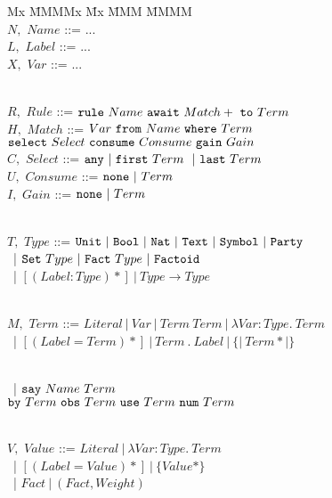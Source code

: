 \begin{figure}
\begin{tabbing}
Mx \= MMMMx \= Mx \= MMM \= MMMM \kill
\\  $N,$ \> $Name$       \> ::= \> ...
\\  $L,$ \> $Label$      \> ::= \> ...
\\  $X,$ \> $Var$        \> ::= \> ...

\\[1ex]
    $R,$ \> $Rule$      \> ::= \> $\texttt{rule}~ Name~ \texttt{await}~ Match+~ \texttt{to}~ Term$
\\[0.5ex]
    $H,$ \> $Match$     \> ::= \> $Var~ \texttt{from}~ Name~ \texttt{where}~ Term$
\\      \>              \>     \> \hspace{1.6em}
                                  $\texttt{select}~ Select~ \texttt{consume}~ Consume~ \texttt{gain}~ Gain$
\\[0.5ex]
   $C,$ \> $Select$     \> ::= \> $\texttt{any}~ |~ \texttt{first}~ Term~ ~|~ \texttt{last}~ Term$
\\ $U,$ \> $Consume$    \> ::= \> $\texttt{none}~ |~ Term$
\\ $I,$ \> $Gain$       \> ::= \> $\texttt{none}~ |~ Term$

\\[1ex]
   $T,$ \> $Type$       \> ::= \> $\texttt{Unit}~ |~ \texttt{Bool}~ |~ \texttt{Nat}~ |~ \texttt{Text}~ |~ \texttt{Symbol}~ |~ \texttt{Party}$
\\ \>                   \> ~|  \> $\texttt{Set}~ Type~ |~ \texttt{Fact}~ Type~ |~ \texttt{Factoid}$
\\ \>                   \> ~|  \> $[ (Label : Type)* ] ~|~ Type \to Type~$

\\[1ex]
  $M,$   \> $Term$      \> ::= \> $Literal~ |~ Var~ |~ Term~ Term~ |~ \lambda Var : Type.~ Term$
\\ \>                   \> ~|  \> $[ (Label = Term)* ]~ |~ Term~ .~ Label ~|~ \{|~ Term* |\}$

\\[0.5ex] \>            \> ~|  \> $\texttt{say}~ Name~ Term~$
\\        \>            \>     \> \hspace{0.5em} $\texttt{by}~ Term~ \texttt{obs}~ Term~ \texttt{use}~ Term~ \texttt{num}~ Term$

\\[1ex]
  $V,$   \> $Value$     \> ::= \> $Literal~ |~ \lambda Var : Type.~ Term$
\\       \>             \> ~|  \> $[ (Label = Value)* ] ~|~ \{ Value* \}$
\\       \>             \> ~|  \> $Fact ~|~ (Fact, Weight)$


\end{tabbing}
\end{figure}
